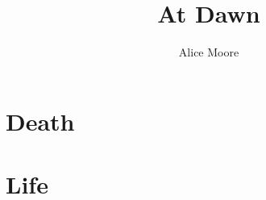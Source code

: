 \documentclass[statementpaper,oneside]{memoir}
\title{At Dawn}
\author{Alice Moore}
\date{}
\begin{document}
\begin{titlingpage}
\maketitle
\end{titlingpage}

\tableofcontents*
\PlainPoemTitle
\part{Death}
\pagestyle{simple}









\part{Life}
\end{document}

